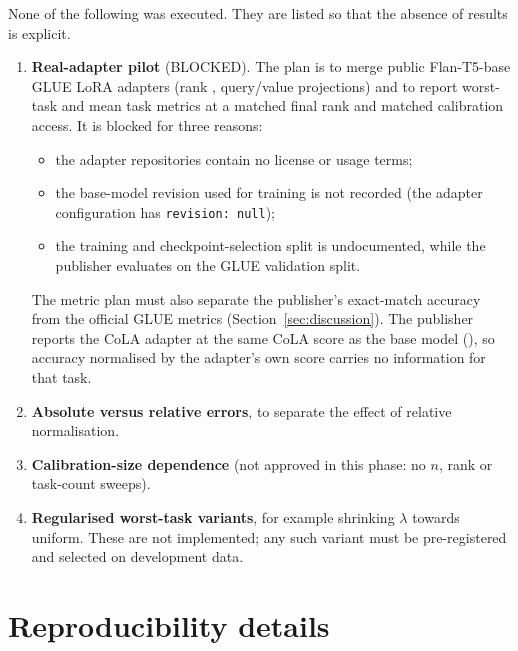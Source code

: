 None of the following was executed. They are listed so that the absence of results is explicit.
\begin{enumerate}
\item \textbf{Real-adapter pilot} (BLOCKED). The plan is to merge \AdmNAdapters{} public Flan-T5-base GLUE
LoRA adapters (rank \AdmLoraR, query/value projections) and to report worst-task and mean task metrics
at a matched final rank and matched calibration access. It is blocked for three reasons:
\begin{itemize}
\item the adapter repositories contain no license or usage terms;
\item the base-model revision used for training is not recorded (the adapter configuration has
\texttt{revision: null});
\item the training and checkpoint-selection split is undocumented, while the publisher evaluates
on the GLUE validation split.
\end{itemize}
The metric plan must also separate the publisher's exact-match accuracy from the official GLUE
metrics (Section~\ref{sec:discussion}). The publisher reports the CoLA adapter at the same CoLA
score as the base model (\AdmCoLAScore), so accuracy normalised by the adapter's own score carries no
information for that task.
\item \textbf{Absolute versus relative errors}, to separate the effect of relative normalisation.
\item \textbf{Calibration-size dependence} (not approved in this phase: no $n$, rank or
task-count sweeps).
\item \textbf{Regularised worst-task variants}, for example shrinking $\lambda$ towards uniform.
These are not implemented; any such variant must be pre-registered and selected on development
data.
\end{enumerate}

\section{Reproducibility details}
\label{app:repro}


